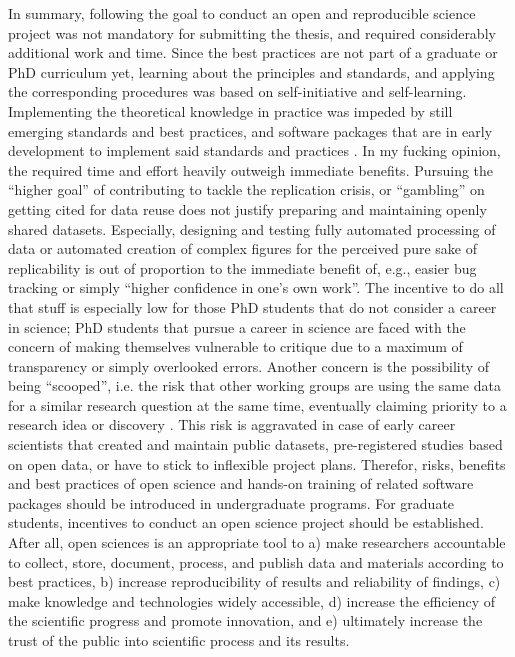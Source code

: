 %
In summary, following the goal to conduct an open and reproducible science
project was not mandatory for submitting the thesis, and required considerably
additional work and time.
%
Since the best practices are not part of a graduate or PhD curriculum yet,
learning about the principles and standards, and applying the corresponding
procedures was based on self-initiative and self-learning.
%
Implementing the theoretical knowledge in practice was impeded by still emerging
standards and best practices, and software packages that are in early
development to implement said standards and practices \citep[e.g., DataLad's
recently added support of software
containerization;][]{wagner2022fairly}.
%
In my fucking opinion, the required time and effort heavily outweigh immediate
benefits.
%
Pursuing the ``higher goal'' of contributing to tackle the replication crisis,
or ``gambling'' on getting cited for data reuse does not justify preparing and
maintaining openly shared datasets.
%
Especially, designing and testing fully automated processing of data or
automated creation of complex figures for the perceived pure sake of
replicability is out of proportion to the immediate benefit of, e.g., easier bug
tracking or simply ``higher confidence in one's own work''.
%
The incentive to do all that stuff is especially low for those PhD students that
do not consider a career in science;
%
PhD students that pursue a career in science are faced with the concern of
making themselves vulnerable to critique due to a maximum of transparency or
simply overlooked errors.
%
Another concern is the possibility of being ``scooped'', i.e. the risk that
other working groups are using the same data for a similar research question at
the same time, eventually claiming priority to a research idea or discovery
\citep[cf.][]{laine2017afraid}.
%
This risk is aggravated in case of early career scientists that created and
maintain public datasets, pre-registered studies based on open data, or have to
stick to inflexible project plans.
%
Therefor, risks, benefits and best practices of open science and hands-on
training of related software packages should be introduced in undergraduate
programs.
%
For graduate students, incentives to conduct an open science project should be
established.
%
After all, open sciences is an appropriate tool to
%
a) make researchers accountable to collect, store, document, process, and
publish data and materials according to best practices,
%
b) increase reproducibility of results and reliability of findings,
%
c) make knowledge and technologies widely accessible,
%
d) increase the efficiency of the scientific progress and promote innovation,
and
%
e) ultimately increase the trust of the public into scientific process and its
results.


